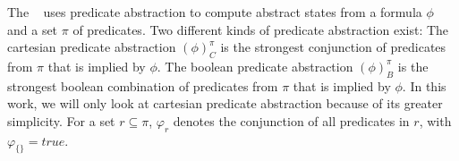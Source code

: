 \subsubsection{\PredicateCPA}
The \predicateCPA\ \cite{BeyerBook} uses predicate abstraction \cite{Ball2001} to compute abstract states from a formula $\phi$ and a set $\pi$ of predicates.
Two different kinds of predicate abstraction exist:
The cartesian predicate abstraction $(\phi)^{\pi}_C$ is the strongest conjunction of predicates from $\pi$ that is implied by $\phi$.
The boolean predicate abstraction $(\phi)^{\pi}_B$ is the strongest boolean combination of predicates from $\pi$ that is implied by $\phi$.
In this work, we will only look at cartesian predicate abstraction because of its greater simplicity.
For a set $r \subseteq \pi$, $\varphi_r$ denotes the conjunction of all predicates in $r$, with $\varphi_{\{\}} = true$.


